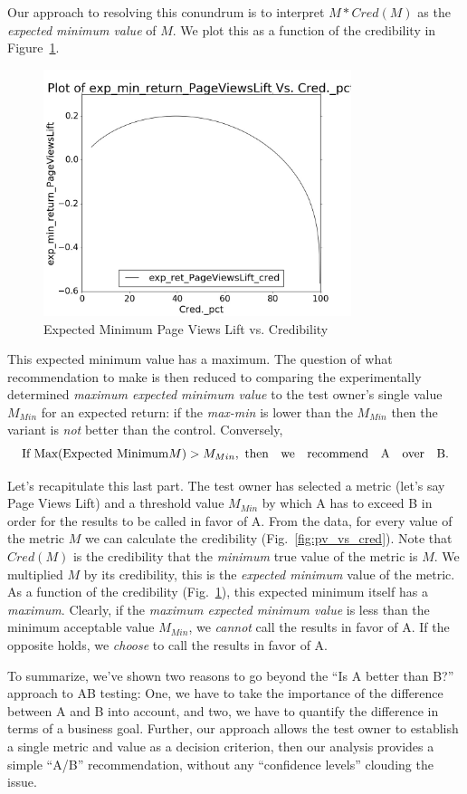 \documentclass[letterpaper,12pt]{article}
\newcommand{\bdm}{\begin{displaymath}} %
\newcommand{\edm}{\end{displaymath}} %
\begin{document}
Our approach to resolving this conundrum is to interpret
\(M*Cred(M) \) as the {\em expected minimum value} of
\(M\). We plot this as a function of the credibility in
Figure~\ref{fig:exp_pv_vs_cred}.
\begin{figure}[ht!]
\centering
\includegraphics[width=90mm]{figures/exp_ret_PageViewsLift_cred}
\caption{Expected Minimum Page Views Lift vs. Credibility \label{fig:exp_pv_vs_cred}}
\end{figure}
This expected minimum value has a maximum. The question of what recommendation to make is then
reduced to comparing the experimentally determined {\em maximum
  expected minimum value} to the test owner's single value \(M_{Min}\) for an expected return: if the
{\em max-min} is lower than the \(M_{Min}\) then the variant is
{\em not} better than the control. Conversely,
\bdm
    \text{If Max(Expected Minimum} M) > M_{Min}, \text{ then\quad we\quad recommend\quad A\quad over\quad B.}
\edm

Let's recapitulate this last part. The test owner has selected a
metric (let's say Page Views Lift) and a threshold value \(M_{Min}\)
by which A has to exceed B in order for the results to be called in
favor of A. From the data, for every value of the metric \(M\) we can
calculate the credibility (Fig.~\ref{fig:pv_vs_cred}). Note that
\(Cred(M)\) is the credibility that the {\em minimum} true value of
the metric is \(M\). We multiplied \(M\) by its credibility, this is
the {\em expected minimum} value of the metric. As a function of the
credibility (Fig.~\ref{fig:exp_pv_vs_cred}), this expected minimum
itself has a {\em maximum}.  Clearly, if the {\em maximum expected
  minimum value} is less than the minimum acceptable value
\(M_{Min}\), we {\em cannot} call the results in favor of A. If the
opposite holds, we {\em choose} to call the results in favor of A.

To summarize, we've shown two reasons to go beyond the ``Is A better
than B?'' approach to AB testing: One, we have to take the importance
of the difference between A and B into account, and two, we have to
quantify the difference in terms of a business goal. Further, our
approach allows the test owner to establish a single metric and value
as a decision criterion, then our analysis provides a simple ``A/B''
recommendation, without any ``confidence levels'' clouding the issue.
\end{document}
